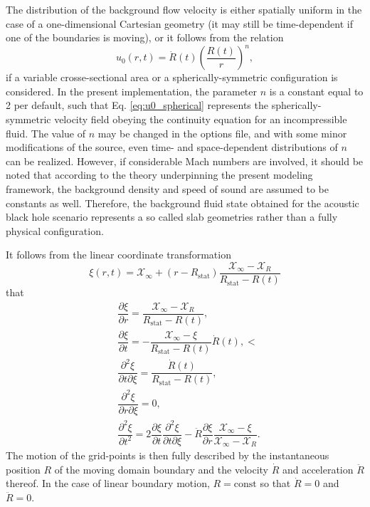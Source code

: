 The distribution of the background flow velocity is either spatially uniform in the case of a one-dimensional Cartesian geometry (it may still be time-dependent if one of the boundaries is moving), or it follows from the relation
\begin{equation}
u_0\left(r,t\right) = \dot R\left(t\right)\left(\dfrac{R\left(t\right)}{r}\right)^n,
\label{eq:u0_spherical}
\end{equation}
if a variable crosse-sectional area or a spherically-symmetric configuration is considered. In the present implementation, the parameter $n$ is a constant equal to 2 per default, such that Eq. \eqref{eq:u0_spherical} represents the spherically-symmetric velocity field obeying the continuity equation for an incompressible fluid. The value of $n$ may be changed in the options file, and with some minor modifications of the source, even time- and space-dependent distributions of $n$ can be realized. However, if considerable Mach numbers are involved, it should be noted that according to the theory underpinning the present modeling framework, the background density and speed of sound are assumed to be constants as well. Therefore, the background fluid state obtained for the acoustic black hole scenario represents a so called slab geometries rather than a fully physical configuration.


It follows from the linear coordinate transformation
\begin{equation}
\xi\left(r,t\right) = \mathcal{X}_{\infty} + \left(r - R_{\mathrm{stat}}\right) \dfrac{\mathcal{X}_{\mathrm{\infty}} - \mathcal{X}_{R}}{R_{\mathrm{stat}}-R\left(t\right)}
\label{eq:linTrans}
\end{equation}
that
\begin{align}
& \dfrac{\partial \xi}{\partial r} = \dfrac{\mathcal{X}_{\mathrm{\infty}} - \mathcal{X}_{R}}{R_{\mathrm{stat}}-R\left(t\right)},
\label{eq:linJacobian} \\[4pt]
& \dfrac{\partial \xi}{\partial t} =
-\dfrac{\mathcal{X}_{\mathrm{\infty}} - \xi}{R_{\mathrm{stat}} - R\left(t\right)} \dot R\left(t\right),<
\label{eq:linq}
\\[4pt]
& \dfrac{\partial^2 \xi}{\partial t \partial \xi} = \dfrac{\dot R\left(t\right)}{R_{\mathrm{stat}} - R\left(t\right)},
\label{eq:lindivq} \\[4pt]
& \dfrac{\partial^2 \xi}{\partial r \partial \xi} = 0,
\label{eq:linJacobiandxi} \\[4pt]
& \dfrac{\partial^2 \xi}{\partial t^2} = 2\dfrac{\partial \xi}{\partial t}\dfrac{\partial^2\xi}{\partial t\partial \xi} - \ddot R\dfrac{\partial \xi}{\partial r} \dfrac{\mathcal{X}_{\infty} - \xi}{\mathcal{X}_{\infty} - \mathcal{X}_{R}}.
\label{eq:lindqdt}
\end{align}
The motion of the grid-points is then fully described by the instantaneous position $R$ of the moving domain boundary and the velocity $\dot R$ and acceleration $\ddot R$ thereof. In the case of linear boundary motion, $R=\mathrm{const}$ so that $\dot R=0$ and $\ddot R=0$. 

